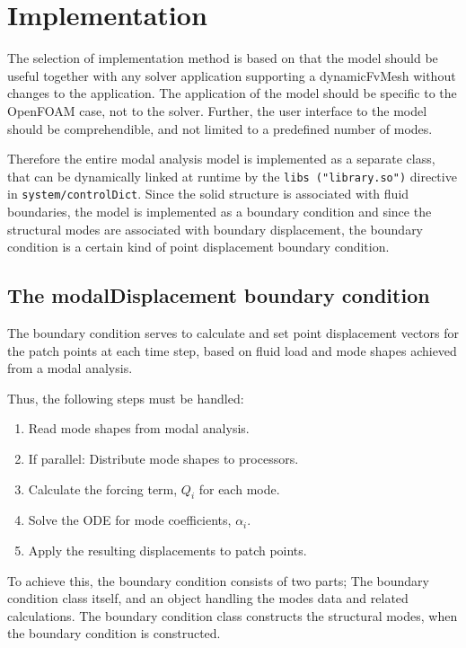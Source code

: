 \section{Implementation} \label{sec:impl}

The selection of implementation method is based on that the model should be
useful together
with any solver application supporting a dynamicFvMesh without changes to the
application. The application of the model should be specific to the OpenFOAM
case, not to the solver. Further, the user interface to the model should be
comprehendible, and not limited to a predefined number of modes.

Therefore the entire modal analysis model is implemented as a separate class,
that can be dynamically linked at runtime by the \texttt{libs ("library.so")}
directive in \texttt{system/controlDict}. Since the solid structure is
associated with fluid boundaries, the model is implemented as a boundary
condition and since the structural modes are associated with boundary
displacement, the boundary condition is a certain kind of point displacement
boundary condition.

\subsection{The modalDisplacement boundary condition}

The boundary condition serves to calculate and set point displacement vectors
for the patch points at each time step, based on fluid load and mode shapes
achieved from a modal analysis.

Thus, the following steps must be handled:

\begin{enumerate}
    \item Read mode shapes from modal analysis.
    \item If parallel: Distribute mode shapes to processors.
    \item Calculate the forcing term, $Q_i$ for each mode.
    \item Solve the ODE for mode coefficients, $\alpha_i$.
    \item Apply the resulting displacements to patch points.
\end{enumerate}

To achieve this, the boundary condition consists of two parts; The boundary
condition class itself, and an object handling the modes data and related calculations.
The boundary condition class constructs the structural modes,
when the boundary condition is constructed.

